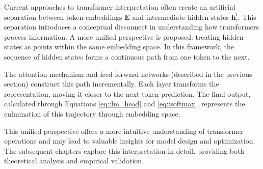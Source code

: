 Current approaches to transformer interpretation often create an artificial separation between token embeddings $\mathbf{E}$ and intermediate hidden states $\mathbf{h}_i^l$. This separation introduces a conceptual disconnect in understanding how transformers process information. A more unified perspective is proposed: treating hidden states as points within the same embedding space. In this framework, the sequence of hidden states forms a continuous path from one token to the next.

The attention mechanism and feed-forward networks (described in the previous section) construct this path incrementally. Each layer transforms the representation, moving it closer to the next token prediction. The final output, calculated through Equations \ref{eq::lm_head} and \ref{eq::softmax}, represents the culmination of this trajectory through embedding space.

This unified perspective offers a more intuitive understanding of transformer operations and may lead to valuable insights for model design and optimization. The subsequent chapters explore this interpretation in detail, providing both theoretical analysis and empirical validation.
